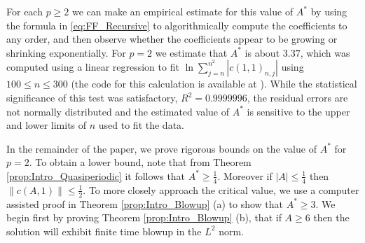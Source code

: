 \documentclass{article}
\begin{document}
For each $ p \geq 2$ we can make an empirical estimate for this value of $ A^*$ by using  the formula in \eqref{eq:FF_Recursive} to algorithmically compute the coefficients to any order, and then observe whether the coefficients appear to be growing or shrinking exponentially. 
For $p=2$ we estimate that $ A^*$ is about  $3.37 $, which was computed using a linear regression to fit $\ln \sum_{j=n}^{n^2} | c(1,1)_{n,j}| $ using $ 100 \leq n \leq 300$ (the code for this calculation is available at \cite{jaquette2020global}). 
 While the statistical significance of this test was satisfactory, $R^2 = 0.9999996$, the residual errors are not normally distributed and the estimated value of $A^*$ is sensitive to the upper and lower limits of $n$ used to fit the data. 

 
 
 
 
 In the remainder of the paper, we prove rigorous bounds on the value of $A^*$ for $ p=2$. 
 To obtain a lower bound, note that from Theorem \ref{prop:Intro_Quasiperiodic}  it follows that   $ A^* \geq   \frac{1}{4}$.  
 Moreover if $ |A| \leq  \frac{1}{4}$ then  $\| c(A,1)\| \leq  \frac{1}{2}$.  
To more closely approach the critical value, we use a computer assisted proof in Theorem \ref{prop:Intro_Blowup} (a) to show that $ A^* \geq 3$. 
We begin first  by proving Theorem \ref{prop:Intro_Blowup} (b), that if $A \geq 6$ then the solution will exhibit finite time blowup in the $L^2$ norm.  
\end{document}
